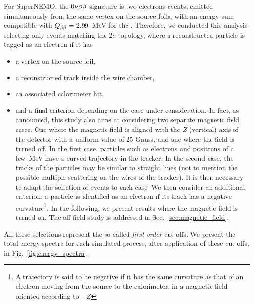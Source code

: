 For SuperNEMO, the $0\nu\beta\beta$ signature is two-electrons events, emitted simultaneously from the same vertex on the source foils, with an energy sum compatible with $Q_{\beta\beta} = 2.99$~MeV for the \Se.
Therefore, we conducted this analysis selecting only events matching the $2e$ topology, where a reconstructed particle is tagged as an electron if it has
\begin{itemize}
\item a vertex on the source foil,
\item a reconstructed track inside the wire chamber,
\item an associated calorimeter hit,
\item and a final criterion depending on the case under consideration.
  In fact, as announced, this study also aims at considering two separate magnetic field cases.
  One where the magnetic field is aligned with the $Z$ (vertical) axis of the detector with a uniform value of $25$ Gauss, and one where the field is turned off.
  In the first case, particles such as electrons and positrons of a few~MeV have a curved trajectory in the tracker.
  In the second case, the tracks of the particles may be similar to straight lines (not to mention the possible multiple scattering on the wires of the tracker).
  It is then necessary to adapt the selection of events to each case.
  We then consider an additional criterion: a particle is identified as an electron if its track has a negative curvature\footnote{A trajectory is said to be negative if it has the same curvature as that of an electron moving from the source to the calorimeter, in a magnetic field oriented according to $+Z$}.
  In the following, we present results where the magnetic field is turned on.
  The off-field study is addressed in Sec.~\ref{sec:magnetic_field}.
\end{itemize}
All these selections represent the so-called \emph{first-order} cut-offs.
We present the total energy spectra for each simulated process, after application of these cut-offs, in Fig.~\ref{fig:energy_spectra}.

